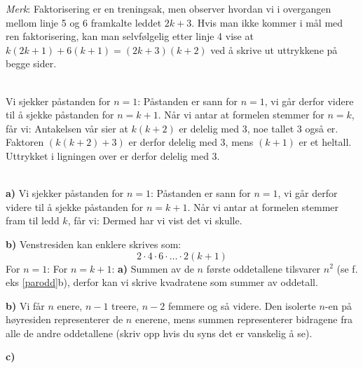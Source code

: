 \textsl{Merk}: Faktorisering er en treningsak, men observer hvordan vi i overgangen mellom linje 5 og 6 framkalte leddet $ 2k+3 $. Hvis man ikke kommer i mål med ren faktorisering, kan man selvfølgelig etter linje 4 vise at $ k(2k+1)+6(k+1)=(2k+3)(k+2) $ ved å skrive ut uttrykkene på begge sider.

 \\
Vi sjekker påstanden for $ {n=1}$:
Påstanden er sann for $ {n=1} $, vi går derfor videre til å sjekke påstanden for $ {n=k+1} $. Når vi antar at formelen stemmer for $ n=k $, får vi:
Antakelsen vår sier at $ k(k+2) $ er delelig med 3, noe tallet 3 også er. Faktoren $ (k(k+2)+3) $ er derfor delelig med 3, mens $ (k+1) $ er et heltall. Uttrykket i ligningen over er derfor delelig med 3.
 
 \\
\textbf{a)} Vi sjekker påstanden for $ {n=1}$:
Påstanden er sann for $ {n=1} $, vi går derfor videre til å sjekke påstanden for $ {n=k+1} $. Når vi antar at formelen stemmer fram til ledd $ k $, får vi:
Dermed har vi vist det vi skulle.

\textbf{b)} Venstresiden kan enklere skrives som:
\[ 2\cdot4\cdot6\cdot\ldots\cdot2(k+1) \]
For $ {n=1} $:
For $ {n=k+1} $:
\newpage
{}
\textbf{a)} Summen av de $ n $ første oddetallene tilsvarer $ n^2 $ (se f. eks \ref{parodd}b), derfor kan vi skrive kvadratene som summer av oddetall.

\textbf{b)} Vi får $ n $ enere, $ {n-1} $ treere, $ {n-2} $ femmere og så videre. Den isolerte $ n $-en på høyresiden representerer de $ n $ enerene, mens summen
representerer bidragene fra alle de andre oddetallene (skriv opp hvis du syns det er vanskelig å se). 

\textbf{c)} \vs
{}


